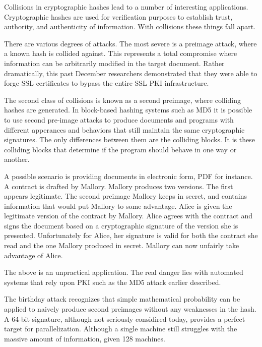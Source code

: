 Collisions in cryptographic hashes lead to a number of interesting applications. 
Cryptographic hashes are used for verification purposes to establish trust, authority,
and authenticity of information. With collisions these things fall apart. 

There are various degrees of attacks. The most severe is a preimage attack, where
a known hash is collided against. This represents a total compromise where information
can be arbitrarily modified in the target document. Rather dramatically, this past December
researchers demonstrated that they were able to forge SSL certificates
\cite{rogue_ca} to bypass the entire SSL PKI infrastructure.

The second class of collisions is known as a second preimage, where colliding hashes
are generated. In block-based hashing systems such as MD5 it is possible to use second 
pre-image attacks to produce documents and programs with different apperances and behaviors
that still maintain the same cryptographic signatures. The only differences between them
are the colliding blocks. It is these colliding blocks that determine if the program should
behave in one way or another.

A possible scenario is providing documents in electronic form, PDF for instance. A contract
is drafted by Mallory. Mallory produces two versions. The first appears legitimate.
The second preimage Mallory keeps in secret, and contains information that would put Mallory
to some advantage. Alice is given the legitimate version of the contract by Mallory. Alice
agrees with the contract and signs the document based on a cryptographic signature of the version
she is presented. Unfortunately for Alice, her signature is valid for both the contract she read
and the one Mallory produced in secret. Mallory can now unfairly take advantage of Alice.

The above is an unpractical application. The real danger lies with automated systems that rely upon
PKI such as the MD5 attack earlier described.

The birthday attack recognizes that simple mathematical probability can be applied to naively produce
second preimages without any weaknesses in the hash. A 64-bit signature, although not seriously considired 
today, provides a perfect target for parallelization. Although a single machine still struggles
with the massive amount of information, given 128 machines.